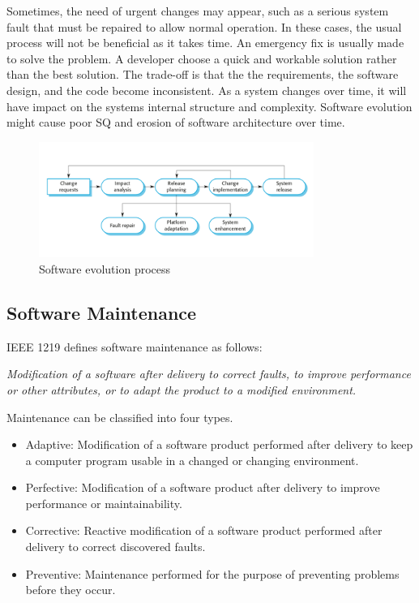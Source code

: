 Sometimes, the need of urgent changes may appear, such as a serious system fault that must be repaired to allow normal operation. In these cases, the usual process will not be beneficial as it takes time. An emergency fix is usually made to solve the problem. A developer choose a quick and workable solution rather than the best solution. The trade-off is that the the requirements, the software design, and the code become inconsistent. As a system changes over time, it will have impact on the systems internal structure and complexity. Software evolution might cause poor SQ and erosion of software architecture over time\cite{Bass:2012:SAP:2392670}.

\begin{figure}[h!]
	\centering
	\includegraphics[width=0.8\textwidth]{images/SEprocess.png}
	\caption{Software evolution process}
	\label{fig:seProcess}
\end{figure}


\subsection{Software Maintenance}
IEEE 1219 defines software maintenance as follows\cite{720567}:
\begin{displayquote}
\textit{Modification of a software after delivery to correct faults, to improve performance or other attributes, or to adapt the product to a modified environment.}
\end{displayquote} 
Maintenance can be classified into four types\cite{Bennett:2000:SME:336512.336534,720567}.

\begin{itemize}
	\item Adaptive: Modification of a software product performed after delivery to keep a computer program usable in a changed or changing environment.
	\item Perfective: Modification of a software product after delivery to improve performance or maintainability.
	\item Corrective: Reactive modification of a software product performed after delivery to correct discovered faults.
	\item Preventive: Maintenance performed for the purpose of preventing problems before they occur.
\end{itemize}

